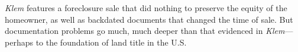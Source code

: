 

\textit{Klem} features a foreclosure sale that did nothing to preserve the
equity of the homeowner, as well as backdated documents that changed the time
of sale. But documentation problems go much, much deeper than that evidenced
in \textit{Klem}---perhaps to the foundation of land title in the U.S. 


